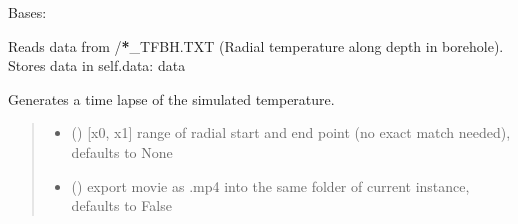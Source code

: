 \documentclass[letterpaper,10pt,english]{sphinxmanual}
\begin{document}
\begin{fulllineitems}
\label{\detokenize{tscw_module:tscw_module.tscw_DataClassesOutput.TSCW_TFBH}}
\pysigstartsignatures
{}
\pysigstopsignatures
\sphinxAtStartPar
Bases: {\hyperref[\detokenize{tscw_module:tscw_module.tscw_DataClassesOutput.TSCW_Output}]{}}

\sphinxAtStartPar
Reads data from /{\color{red}\bfseries{}*}\_TFBH.TXT (Radial temperature along depth in borehole).
Stores data in
self.data: \sphinxhyphen{} data

\begin{fulllineitems}
\label{\detokenize{tscw_module:tscw_module.tscw_DataClassesOutput.TSCW_TFBH.create_movie}}
\pysigstartsignatures
{}
\pysigstopsignatures
\sphinxAtStartPar
Generates a time lapse of the simulated temperature.
\begin{quote}\begin{description}
\begin{itemize}
\item {} 
\sphinxAtStartPar
{} (\sphinxstyleliteralemphasis{\sphinxupquote{, }}) \textendash{} {[}x0, x1{]} range of radial start and end point (no exact match needed), defaults to None

\item {} 
\sphinxAtStartPar
{} (\sphinxstyleliteralemphasis{\sphinxupquote{, }}) \textendash{} export movie as .mp4 into the same folder of current instance, defaults to False


\end{itemize}
\end{description}
\end{quote}
\end{fulllineitems}
\end{fulllineitems}
\end{document}
